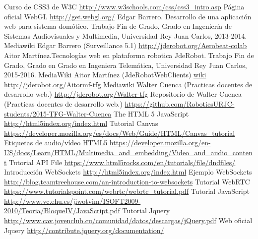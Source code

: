 \documentclass[oneside,a4paper,11pt]{book}
\begin{document}
%
\thispagestyle{empty}
\begin{thebibliography}{99}
 Curso de CSS3 de W3C \url{http://www.w3schools.com/css/css3_intro.asp}
 Página oficial WebGL \url{http://get.webgl.org/}  
 Edgar Barrero. Desarrollo de una aplicación web para sistema domótico. Trabajo Fin de Grado, Grado en Ingeniería de Sistemas Audiovisuales y Multimedia, Universidad Rey Juan Carlos, 2013-2014.
 Mediawiki Edgar Barrero (Surveillance 5.1) \url{http://jderobot.org/Aerobeat-colab}
 Aitor Martínez.Tecnologías web en plataforma robotica JdeRobot. Trabajo Fin de Grado, Grado en Grado en Ingeniera Telemática, Universidad Rey Juan Carlos, 2015-2016.
 MediaWiki Aitor Martínez (JdeRobotWebClients) \url{wiki http://jderobot.org/Aitormf-tfg}
 Mediawiki Walter Cuenca (Practicas docentes de desarrollo web.) \url{http://jderobot.org/Walter-tfg} 
 Repositorio de Walter Cuenca (Practicas docentes de desarrollo web.) \url{https://github.com/RoboticsURJC-students/2015-TFG-Walter-Cuenca} 
 The HTML 5 JavaScript  \url{http://html5index.org/index.html}
 Tutorial Canvas  \url{https://developer.mozilla.org/es/docs/Web/Guide/HTML/Canvas\_tutorial}
 Etiquetas de audio/vídeo HTML5  \url{https://developer.mozilla.org/en-US/docs/Learn/HTML/Multimedia\_and\_embedding/Video\_and\_audio\_content}
 Tutorial API File  \url{https://www.html5rocks.com/en/tutorials/file/dndfiles/}
 Introducción WebSockets  \url{http://html5index.org/index.html}
Ejemplo WebSockets  \url{ http://blog.teamtreehouse.com/an-introduction-to-websockets}
Tutorial WebRTC  \url{https://www.tutorialspoint.com/webrtc/webrtc\_tutorial.pdf}
Tutorial JavaScript \url{http://www.vc.ehu.es/jiwotvim/ISOFT2009-2010/Teoria/BloqueIV/JavaScript.pdf}
Tutorial Jquery \url{http://www.cav.jovenclub.cu/comunidad/datos/descargas/jQuery.pdf}
 Web oficial Jquery \url{http://contribute.jquery.org/documentation/}

\end{thebibliography}
\end{document}
